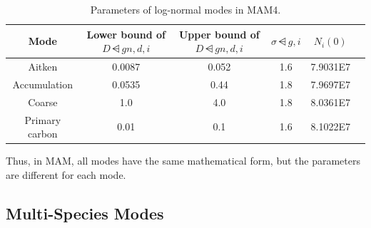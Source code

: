 \begin{table}[htbp]
\centering
\caption{Parameters of log-normal modes in MAM4.}
\label{tab:mode_size_parameters}
\begin{tabular}{cccccc}
  \toprule
  Mode           &  Lower bound of $D\dsub{gn,d,i}$
                 &  Upper bound of $D\dsub{gn,d,i}$  &  $\sigma\dsub{g,i}$ 
                 & $N_i(0)$\\
  \midrule
  Aitken 	 &  0.0087  &   0.052  &  1.6     & 7.9031E7\\
  Accumulation   &  0.0535  &   0.44   &  1.8 & 7.9697E7\\
  Coarse         &  1.0     &   4.0    &  1.8 & 8.0361E7\\
  Primary carbon &  0.01    &   0.1    &  1.6 & 8.1022E7\\
  \bottomrule
\end{tabular}
\end{table}

Thus, in MAM, all modes have the same mathematical form, but the parameters
are different for each mode.

\subsection*{Multi-Species Modes}

